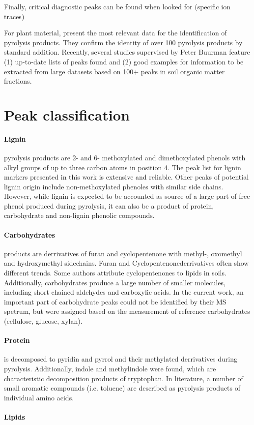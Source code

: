 Finally, critical diagnostic peaks can be found when looked for (specific ion traces)

For plant material, \cite{Ralph1991} present the most relevant data for the identification of pyrolysis products. They confirm the identity of over 100 pyrolysis products by standard addition. Recently, several studies supervised by Peter Buurman \citep{Schellekens2009,Buurman2010, Vancampenhout2009 } feature (1) up-to-date lists of peaks found and (2) good examples for information to be extracted from large datasets based on 100+ peaks in soil organic matter fractions.

\section{Peak classification}

\paragraph{Lignin} pyrolysis products are 2- and 6- methoxylated and dimethoxylated phenols with alkyl groups of up to three carbon atoms in position 4. The peak list for lignin markers presented in this work is extensive and reliable. Other peaks of potential lignin origin include non-methoxylated phenoles with similar side chains. However, while lignin is expected to be accounted as source of a large part of free phenol produced during pyrolysis, it can also be a product of protein, carbohydrate and non-lignin phenolic compounds.

\paragraph{Carbohydrates} products are derrivatives of furan and cyclopentenone with methyl-, oxomethyl and hydroxymethyl sidechains. Furan and Cyclopentenonederrivatives often show different trends. Some authors attribute cyclopentenones to lipids in soils. Additionally, carbohydrates produce a large number of smaller molecules, including short chained aldehydes and carboxylic acids. In the current work, an important part of carbohydrate peaks could not be identified by their MS spetrum, but were assigned based on the measurement of reference carbohydrates (cellulose, glucose, xylan).

\paragraph{Protein} is decomposed to pyridin and pyrrol and their methylated derrivatives during pyrolysis. Additionally, indole and methylindole were found, which are characteristic decomposition products of tryptophan. In literature, a number of small aromatic compounds (i.e. toluene) are described as pyrolysis products of individual amino acids. 

\paragraph{Lipids}